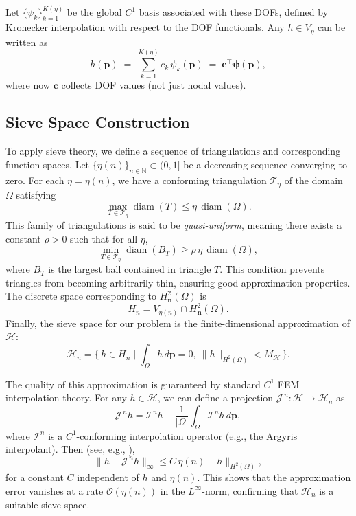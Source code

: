 \documentclass[11pt]{article}
\begin{document}
Let $\{\psi_k\}_{k=1}^{K(\eta)}$ be the global $C^1$ basis associated with these DOFs, defined by Kronecker interpolation with respect to the DOF functionals. Any $h\in V_\eta$ can be written as
\[
h(\bm p) \;=\; \sum_{k=1}^{K(\eta)} c_k\,\psi_k(\bm p) \;=\; \mathbf c^\top \bm\psi(\bm p),
\]
where now $\mathbf c$ collects DOF values (not just nodal values).

\subsection{Sieve Space Construction}\label{sec:sieve_space_construction}
To apply sieve theory, we define a sequence of triangulations and corresponding function spaces. Let $\{\eta(n)\}_{n \in \mathbb{N}} \subset (0,1]$ be a decreasing sequence converging to zero. For each $\eta=\eta(n)$, we have a conforming triangulation $\mathcal{T}_{\eta}$ of the domain $\Omega$ satisfying
\[
\max_{T \in \mathcal{T}_{\eta}} \operatorname{diam}(T) \le \eta \, \operatorname{diam}(\Omega).
\]
This family of triangulations is said to be \emph{quasi-uniform}, meaning there exists a constant $\rho > 0$ such that for all $\eta$,
\[
\min_{T \in \mathcal{T}_{\eta}} \operatorname{diam}(B_T) \ge \rho\, \eta\,  \operatorname{diam}(\Omega),
\]
where $B_T$ is the largest ball contained in triangle $T$. This condition prevents triangles from becoming arbitrarily thin, ensuring good approximation properties.
The discrete space corresponding to $H^2_{\mathbf n}(\Omega)$ is
\[
H_n = V_{\eta(n)} \cap H^2_{\mathbf n}(\Omega).
\]
Finally, the sieve space for our problem is the finite-dimensional approximation of $\mathcal{H}$:
\[
\mathcal H_n = \Big\{\, h \in H_n \;\Big|\; \int_\Omega h\,d\bm p = 0,\ \|h\|_{H^2(\Omega)} < M_{\mathcal H} \,\Big\}.
\]

The quality of this approximation is guaranteed by standard $C^1$ FEM interpolation theory. For any $h \in \mathcal{H}$, we can define a projection $\mathcal{J}^{\,n} : \mathcal{H} \to \mathcal{H}_n$ as
\[
\mathcal J^{\,n} h = \mathcal I^{\,n} h - \frac{1}{|\Omega|} \int_{\Omega} \mathcal I^{\,n} h\, d\bm p,
\]
where $\mathcal I^{\,n}$ is a $C^1$-conforming interpolation operator (e.g., the Argyris interpolant). Then (see, e.g., \citealp{brenner2008mathematical}),
\begin{equation}\label{eq:bound_approx}
	\|h - \mathcal{J}^{\,n} h\|_{\infty} \le C\, \eta(n)\, \|h\|_{H^2(\Omega)},
\end{equation}
for a constant $C$ independent of $h$ and $\eta(n)$. This shows that the approximation error vanishes at a rate $\mathcal{O}(\eta(n))$ in the $L^\infty$-norm, confirming that $\mathcal{H}_n$ is a suitable sieve space.
\end{document}
